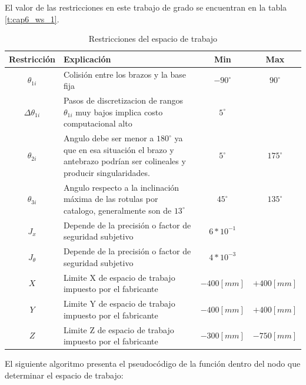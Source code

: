     El valor de las restricciones en este trabajo de grado se encuentran en la tabla \eqref{t:cap6_ws_1}.
    
            \begingroup
            \renewcommand{\arraystretch}{1.2}
            \begin{table}[H]
            \centering
            \begin{tabular}{c m{7.5cm} c c}
               \hline
               \textbf{Restricción}  & \textbf{Explicación} & \textbf{Min}& \textbf{Max}\\
               \hline           \hline            
             $\theta_{1i}$ & Colisión entre los brazos y la base fija & $-90^{\circ}$ & $90^{\circ}$\\
            \hline
             $\Delta\theta _{1i}$ & Pasos de discretizacion de rangos $\theta_{1i}$ muy bajos implica costo computacional alto& $5^{\circ}$ & $ $ \\
            \hline
             $\theta _{2i}$ & Angulo debe ser menor a $180^{\circ}$ ya que en esa situación el brazo y antebrazo podrían ser colineales y producir singularidades.& $5^{\circ}$ & $175^{\circ}$ \\
            \hline
             $\theta _{3i}$ & Angulo respecto a la inclinación máxima de las rotulas por catalogo, generalmente son de $13^{\circ}$ & $45^{\circ}$ & $135^{\circ}$ \\
            \hline
             $J_{x}$ & Depende de la precisión o factor de seguridad subjetivo& $6*10^{-1}$ & $ $ \\
            \hline
             $J_{\theta}$ & Depende de la precisión o factor de seguridad subjetivo& $4*10^{-3}$ & $ $ \\
            \hline
             $X$ & Limite X de espacio de trabajo impuesto por el fabricante & $-400[mm]$ & $+400[mm]$ \\
            \hline            
             $Y$ & Limite Y de espacio de trabajo impuesto por el fabricante & $-400[mm]$ & $+400[mm]$ \\
            \hline   
             $Z$ & Limite Z de espacio de trabajo impuesto por el fabricante & $-300[mm]$ & $-750[mm]$ \\
            \hline   
            \end{tabular}
            \caption{Restricciones del espacio de trabajo}
            \label{t:cap6_ws_1}
        \end{table}
        \endgroup     
        \newpage

    El siguiente algoritmo presenta el pseudocódigo de la función dentro del nodo que determinar el espacio de trabajo:
    
